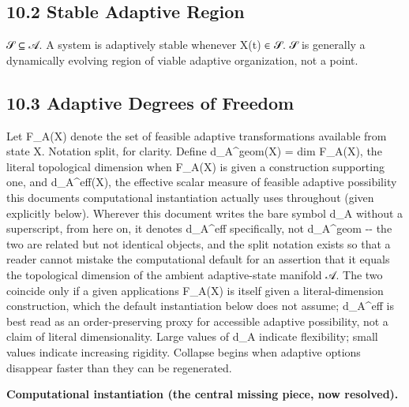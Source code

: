 \documentclass[
]{article}
\begin{document}
\hypertarget{stable-adaptive-region}{%
\subsection{10.2 Stable Adaptive Region}\label{stable-adaptive-region}}

𝒮 ⊆ 𝒜. A system is adaptively stable whenever X(t) ∈ 𝒮. 𝒮 is generally a
dynamically evolving region of viable adaptive organization, not a
point.

\hypertarget{adaptive-degrees-of-freedom}{%
\subsection{10.3 Adaptive Degrees of
Freedom}\label{adaptive-degrees-of-freedom}}

Let F\_A(X) denote the set of feasible adaptive transformations
available from state X. Notation split, for clarity. Define
d\_A\^{}geom(X) = dim F\_A(X), the literal topological dimension when
F\_A(X) is given a construction supporting one, and d\_A\^{}eff(X), the
effective scalar measure of feasible adaptive possibility this
document\textquotesingle s computational instantiation actually uses
throughout (given explicitly below). Wherever this document writes the
bare symbol d\_A without a superscript, from here on, it denotes
d\_A\^{}eff specifically, not d\_A\^{}geom -\/- the two are related but
not identical objects, and the split notation exists so that a reader
cannot mistake the computational default for an assertion that it equals
the topological dimension of the ambient adaptive-state manifold 𝒜. The
two coincide only if a given application\textquotesingle s F\_A(X) is
itself given a literal-dimension construction, which the default
instantiation below does not assume; d\_A\^{}eff is best read as an
order-preserving proxy for accessible adaptive possibility, not a claim
of literal dimensionality. Large values of d\_A indicate flexibility;
small values indicate increasing rigidity. Collapse begins when adaptive
options disappear faster than they can be regenerated.

\textbf{Computational instantiation (the central missing piece, now
resolved).}
\end{document}
